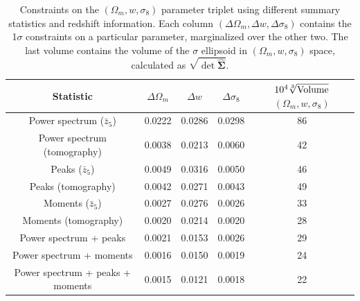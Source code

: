 \documentclass[reprint,aps,prd,superscriptaddress,showkeys,showpacs]{revtex4-1}
\newcommand{\bbh}[1]{\mathbf{\hat{#1}}}
\begin{document}
\begin{table}
\begin{tabular}{c|c|c|c|c|}
\toprule
                        \textbf{Statistic} & $\Delta \Omega_m$ & $\Delta w$ & $\Delta \sigma_8$ & $10^4\sqrt[3]{\rm Volume}$ $(\Omega_m,w,\sigma_8)$ \\ \hline \hline
\midrule
     Power spectrum ($\bar{z}_5$) &            0.0222 &     0.0286 &            0.0298 &                                                 86 \\
      Power spectrum (tomography) &            0.0038 &     0.0213 &            0.0060 &                                                 42 \\
              Peaks ($\bar{z}_5$) &            0.0049 &     0.0316 &            0.0050 &                                                 46 \\
               Peaks (tomography) &            0.0042 &     0.0271 &            0.0043 &                                                 49 \\
            Moments ($\bar{z}_5$) &            0.0027 &     0.0276 &            0.0026 &                                                 33 \\
             Moments (tomography) &            0.0020 &     0.0214 &            0.0020 &                                                 28 \\ \hline \hline
           Power spectrum + peaks &            0.0021 &     0.0153 &            0.0026 &                                                 29 \\
         Power spectrum + moments &            0.0016 &     0.0150 &            0.0019 &                                                 24 \\
 Power spectrum + peaks + moments &            0.0015 &     0.0121 &            0.0018 &                                                 22 \\ \hline
\bottomrule
\end{tabular}
\caption{Constraints on the $(\Omega_m,w,\sigma_8)$ parameter triplet using different summary statistics and redshift information. Each column $(\Delta \Omega_m,\Delta w,\Delta \sigma_8)$ contains the 1$\sigma$ constraints on a particular parameter, marginalized over the other two. The last volume contains the volume of the $\sigma$ ellipsoid in $(\Omega_m,w,\sigma_8)$ space, calculated as $\sqrt{\det \bbh{\Sigma}}$.}
\label{tbl:constraints}
\end{table}
\end{document}
